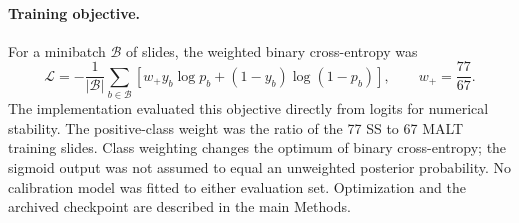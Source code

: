 \paragraph{Training objective.}
For a minibatch $\mathcal{B}$ of slides, the weighted binary cross-entropy was
\begin{equation}\label{eq:loss}
 \mathcal{L}=-\frac{1}{|\mathcal{B}|}\sum_{b\in\mathcal{B}}
 \left[w_{+}y_b\log p_b+(1-y_b)\log(1-p_b)\right],
 \qquad w_{+}=\frac{77}{67}.
\end{equation}
The implementation evaluated this objective directly from logits for numerical
stability. The positive-class weight was the ratio of the 77 SS to 67 MALT
training slides. Class weighting changes the optimum of binary cross-entropy;
the sigmoid output was not assumed to equal an unweighted posterior probability.
No calibration model was fitted to either evaluation set. Optimization and the
archived checkpoint are described in the main Methods.
